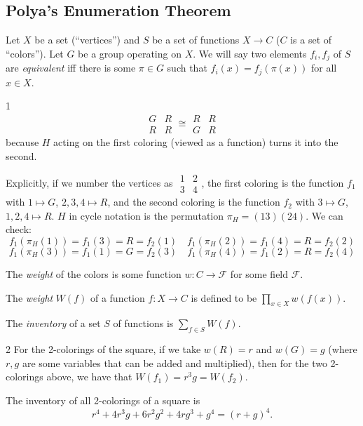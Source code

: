 \subsection{Polya's Enumeration Theorem}
\begin{definition}
    Let $X$ be a set (``vertices'') and $S$ be a set of functions $X \to C$ 
    ($C$ is a set of ``colors''). Let $G$ be a group operating on $X$. We 
    will say two elements $f_i, f_j$ of $S$ are \emph{equivalent} iff 
    there is some $\pi \in G$ such that $f_i(x) = f_j(\pi(x))$ for all $x \in X$. 
\end{definition}
\begin{example}1
    \[ \begin{array}{cc}G & R \\ R & R  \end{array} \cong 
    \begin{array}{cc}R & R \\ G & R  \end{array}\]
    because $H$ acting on the first coloring (viewed as a function) turns it into the second. 

    Explicitly, if we number the vertices as $\begin{array}{cc}1&2 \\3&4 \end{array}$,
    the first coloring is the function $f_1$ with $1 \mapsto G$, $2, 3, 4 \mapsto R$, and
    the second coloring is the function $f_2$ with $3 \mapsto G$, $1,2,4 \mapsto R$. $H$ 
    in cycle notation is the permutation $\pi_H = (13)(24)$. We can check: 
    \[
        f_1(\pi_H(1)) = f_1(3) = R = f_2(1) \quad f_1(\pi_H(2)) = f_1(4) = R = f_2(2)
    \] 
    \[
        f_1(\pi_H(3)) = f_1(1) = G = f_2(3) \quad f_1(\pi_H(4)) = f_1(2) = R = f_2(4)
    \]
\end{example}
\begin{definition}
    The \emph{weight} of the colors is some function $w : C \to \mathcal F$ 
    for some field $\mathcal F$.
\end{definition}
\begin{definition}
    The \emph{weight} $W(f)$ of a function $f : X \to C$ is defined to be $\prod_{x\in X} w(f(x))$. 
\end{definition}
\begin{definition}
    The \emph{inventory} of a set $S$ of functions is $\sum_{f \in S} W(f)$. 
\end{definition}
\begin{example}2
    For the 2-colorings of the square, if we take $w(R) = r$ and $w(G) = g$ 
    (where $r, g$ are some variables that can be added and multiplied), then 
    for the two 2-colorings above, we have that $W(f_1) = r^3 g = W(f_2)$. 

    The inventory of all 2-colorings of a square is 
    \[
        r^4 + 4 r^3g + 6r^2g^2 + 4rg^3 + g^4 = (r+g)^4.
    \]
\end{example}

